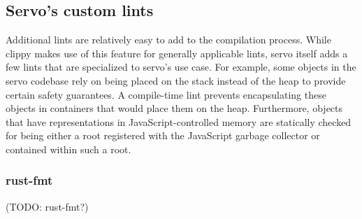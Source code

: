 \documentclass{scrartcl}
\newcommand{\todo}[1] {{\color{red}(TODO: #1)}}
\begin{document}
\subsection{Servo's custom lints}

Additional lints are relatively easy to add to the compilation process. While clippy makes use of this feature for generally applicable lints, servo itself adds a few lints that are specialized to servo's use case. For example, some objects in the servo codebase rely on being placed on the stack instead of the heap to provide certain safety guarantees. A compile-time lint prevents encapsulating these objects in containers that would place them on the heap. Furthermore, objects that have representations in JavaScript-controlled memory are statically checked for being either a root registered with the JavaScript garbage collector or contained within such a root.

\subsubsection{rust-fmt}
\todo{rust-fmt?}
\end{document}
